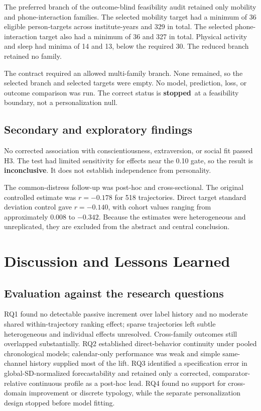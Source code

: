 \documentclass[a4paper,11pt,oneside]{report}
\newcommand{\stopped}{\textcolor{statusblue}{\textbf{stopped}}}
\newcommand{\inconclusive}{\textcolor{statusgray}{\textbf{inconclusive}}}
\begin{document}
The preferred branch of the outcome-blind feasibility audit retained only mobility
and phone-interaction families. The selected mobility target had a minimum of 36
eligible person-targets across institute-years and 329 in total. The selected
phone-interaction target also had a minimum of 36 and 327 in total. Physical activity
and sleep had minima of 14 and 13, below the required 30. The reduced branch retained
no family.

The contract required an allowed multi-family branch. None remained, so the selected
branch and selected targets were empty. No model, prediction, loss, or outcome
comparison was run. The correct status is \stopped\ at a feasibility boundary, not
a personalization null.

\section{Secondary and exploratory findings}

No corrected association with conscientiousness, extraversion, or social fit passed
H3. The test had limited sensitivity for effects near the 0.10 gate, so the result is
\inconclusive. It does not establish independence from personality.

The common-distress follow-up was post-hoc and cross-sectional. The original
controlled estimate was $r=-0.178$ for 518 trajectories. Direct target standard
deviation control gave $r=-0.140$, with cohort values ranging from approximately
0.008 to $-0.342$. Because the estimates were heterogeneous and unreplicated, they
are excluded from the abstract and central conclusion.

\chapter{Discussion and Lessons Learned}
\label{ch:discussion}

\section{Evaluation against the research questions}

RQ1 found no detectable passive increment over label history and no moderate shared
within-trajectory ranking effect; sparse trajectories left subtle heterogeneous and
individual effects unresolved. Cross-family outcomes still overlapped substantially.
RQ2 established direct-behavior continuity under pooled chronological models;
calendar-only performance was weak and simple same-channel history supplied most of
the lift. RQ3 identified a specification error in global-SD-normalized
forecastability and retained only a corrected, comparator-relative continuous
profile as a post-hoc lead. RQ4 found no support for cross-domain improvement or
discrete typology, while the separate personalization design stopped before model
fitting.
\end{document}
